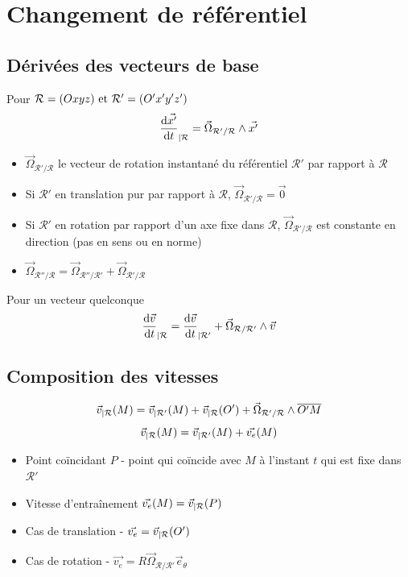 \documentclass[openany]{book}
\begin{document}
\section{Changement de référentiel}
\subsection{Dérivées des vecteurs de base}
Pour $\mathcal{R} = (Oxyz) \text{ et } \mathcal{R}' = (O'x'y'z')$
\[ \frac{\text{d} \vec{x'}}{\text{d}t}_{|\mathcal{R}} = \vec{\Omega}_{\mathcal{R} ' / \mathcal{R}}\wedge \vec{x'} \] 

\begin{itemize}
    \item $\vec{\Omega}_{\mathcal{R} ' / \mathcal{R}}$ le vecteur de rotation instantané du référentiel $\mathcal{R}'$ par rapport à $\mathcal{R}$
    \item Si $\mathcal{R}'$ en translation pur par rapport à $\mathcal{R}$, $\vec{\Omega}_{\mathcal{R} ' / \mathcal{R}} = \vec{0}$
    \item Si $\mathcal{R}'$ en rotation par rapport d'un axe fixe dans $\mathcal{R}$, $\vec{\Omega}_{\mathcal{R} '/ \mathcal{R}}$ est constante en direction (pas en sens ou en norme)
    \item $\vec{\Omega}_{\mathcal{R} ''/ \mathcal{R}} = \vec{\Omega}_{\mathcal{R} ''/ \mathcal{R}'} + \vec{\Omega}_{\mathcal{R} '/ \mathcal{R}}$
\end{itemize}

Pour un vecteur quelconque
\[ \frac{\text{d} \vec{v}}{\text{d}t}_{|\mathcal{R}} = \frac{\text{d} \vec{v}}{\text{d}t}_{|\mathcal{R} '} + \vec{\Omega}_{\mathcal{R} / \mathcal{R} '}\wedge \vec{v} \] 

\subsection{Composition des vitesses}
\[ \vec{v}_{|\mathcal{R}} (M) = \vec{v}_{|\mathcal{R} '} (M) + \vec{v}_{|\mathcal{R}} (O') + \vec{\Omega}_{\mathcal{R}' / \mathcal{R}} \wedge \overline{O'M} \]
\[ \vec{v}_{|\mathcal{R}} (M) = \vec{v}_{|\mathcal{R} '} (M) + \vec{v_{e}} (M) \]

\begin{itemize}
    \item Point coïncidant $P$ - point qui coïncide avec $M$ à l'instant $t$ qui est fixe dans $\mathcal{R'}$
    \item Vitesse d'entraînement $\vec{v_e} (M) = \vec{v}_{|\mathcal{R}}(P)$
    \item Cas de translation - $\vec{v_e} = \vec{v}_{|\mathcal{R}}(O')$
    \item Cas de rotation - $\vec{v_e} = R \vec{\Omega}_{\mathcal{R} / \mathcal{R} '} \vec{e}_{\theta}$
\end{itemize}
\end{document}
